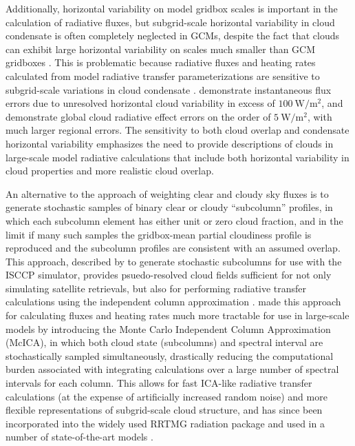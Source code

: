 Additionally, horizontal variability on model gridbox scales is
important in the calculation of radiative fluxes, but subgrid-scale
horizontal variability in cloud condensate is often completely neglected
in GCMs, despite the fact that clouds can exhibit large horizontal
variability on scales much smaller than GCM gridboxes
\citep[e.g.,][]{stephens_and_platt_1987}. This is problematic because
radiative fluxes and heating rates calculated from model radiative
transfer parameterizations are sensitive to subgrid-scale variations in
cloud condensate
\citep[e.g.,][]{barker_et_al_1999, wu_and_liang_2005, oreopoulos_et_al_2012}.
\citet{barker_et_al_1999} demonstrate instantaneous flux errors due to
unresolved horizontal cloud variability in excess of
\(100~\textrm{W}/\textrm{m}^2\), and \citet{oreopoulos_et_al_2012}
demonstrate global cloud radiative effect errors on the order of
\(5~\textrm{W}/\textrm{m}^2\), with much larger regional errors. The
sensitivity to both cloud overlap and condensate horizontal variability
emphasizes the need to provide descriptions of clouds in large-scale
model radiative calculations that include both horizontal variability in
cloud properties and more realistic cloud overlap.

An alternative to the approach of weighting clear and cloudy sky fluxes
is to generate stochastic samples of binary clear or cloudy
``subcolumn'' profiles, in which each subcolumn element has either unit
or zero cloud fraction, and in the limit if many such samples the
gridbox-mean partial cloudiness profile is reproduced and the subcolumn
profiles are consistent with an assumed overlap. This approach,
described by \citet{klein_and_jakob_1999} to generate stochastic
subcolumns for use with the ISCCP simulator, provides psuedo-resolved
cloud fields sufficient for not only simulating satellite retrievals,
but also for performing radiative transfer calculations using the
independent column approximation \citep[ICA;][]{cahalan_et_al_1994}.
\citet{pincus_et_al_2003} made this approach for calculating fluxes and
heating rates much more tractable for use in large-scale models by
introducing the Monte Carlo Independent Column Approximation (McICA), in
which both cloud state (subcolumns) and spectral interval are
stochastically sampled simultaneously, drastically reducing the
computational burden associated with integrating calculations over a
large number of spectral intervals for each column. This allows for fast
ICA-like radiative transfer calculations (at the expense of artificially
increased random noise) and more flexible representations of
subgrid-scale cloud structure, and has since been incorporated into the
widely used RRTMG radiation package and used in a number of
state-of-the-art models
\citep{iacono_et_al_2008, von_salzen_et_al_2012, neale_et_al_2010a, neale_et_al_2010b, donner_et_al_2011, hogan_et_al_2014}.

